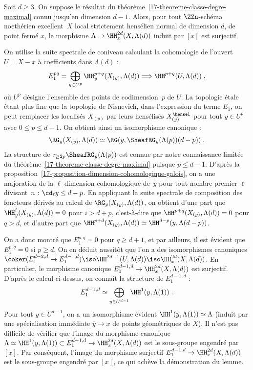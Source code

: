 \documentclass[10pt]{../fichiers-configuration-latex/smfart}
\begin{document}
\begin{lemme2}
Soit $d\geq 3$.
On suppose le résultat du théorème~\ref{17-theoreme-classe-degre-maximal}
connu jusqu'en dimension $d-1$. Alors, pour tout $\ZZn$-schéma noethérien
excellent $X$ local strictement hensélien normal de dimension $d$, de point
fermé $x$, le morphisme $\Lambda\to \HH^{2d}_x(X,\Lambda(d))$
induit par $[x]$ est surjectif.
\end{lemme2}

On utilise la suite spectrale de coniveau calculant la cohomologie de
l'ouvert $U=X-x$ à coefficients dans $\Lambda(d)$ :
\[E_1^{pq}=\bigoplus_{y\in U^p} \HH^{p+q}_y(X_{(y)},\Lambda(d))\Longrightarrow
\HH^{p+q}(U,\Lambda(d))\;\text{,}\]
où $U^p$ désigne l'ensemble des points de codimension $p$ de $U$. La
topologie étale étant plus fine que la topologie de Nisnevich, dans
l'expression du terme $E_1$, on peut remplacer les localisés $X_{(y)}$ par
leurs hensélisés $X_{(y)}^\hensel$ pour tout $y\in U^p$ avec $0\leq p\leq
d-1$. On obtient ainsi un isomorphisme
canonique :
\[\RG_y(X_{(y)},\Lambda(d))\simeq
\RG(y,\SheafRG_y(\Lambda(p))(d-p))\;\text{.}\]
La structure de $\tau_{\geq 2p}\SheafRG_y(\Lambda(p))$ est
connue par notre connaissance limitée du
théorème~\ref{17-theoreme-classe-degre-maximal} puisque $p\leq d-1$. D'après
la proposition~\ref{17-proposition-dimension-cohomologique-galois}, on a une
majoration de la $\ell$-dimension cohomologique de $y$ pour tout nombre
premier $\ell$ divisant $n$ : $\cd_\ell y\leq d-p$.
En appliquant la suite spectrale de composition des
foncteurs dérivés au calcul de $\RG_y(X_{(y)},\Lambda(d))$, on
obtient
d'une part que $\HH^i_y(X_{(y)},\Lambda(d))=0$ pour $i>d+p$, c'est-à-dire que
$\HH^{p+q}(X_{(y)},\Lambda(d))=0$ pour $q>d$, et d'autre part que 
$\HH^{p+d}(X_{(y)},\Lambda(d))\simeq \HH^{d-p}(y,\Lambda(d-p))$.

On a donc montré que $E^{p,q}_1=0$ pour $q\geq d+1$, et par ailleurs, il est
évident que $E^{p,q}_1=0$ si $p\geq d$.
On en déduit aussitôt que l'on a
des isomorphismes canoniques $\coker(E^{d-2,d}_1\to E^{d-1,d}_1)\iso
\HH^{2d-1}(U,\Lambda(d))\iso \HH^{2d}_x(X,\Lambda(d))$. En particulier, le
morphisme canonique $E^{d-1,d}_1\to \HH^{2d}_x(X,\Lambda(d))$ est surjectif.
D'après le calcul ci-dessus, on connaît la structure de $E^{d-1,d}_1$ :
\[E^{d-1,d}_1 \simeq  \bigoplus_{y\in U^{d-1}} \HH^1(y,\Lambda(1))\;\text{.}\]
Pour tout $y\in U^{d-1}$, on a 
un isomorphisme évident $\HH^1(y,\Lambda(1))\simeq \Lambda$ (induit par une
spécialisation immédiate $\overline y\to x$ de points géométriques de $X$).
Il n'est pas difficile de vérifier que l'image du
morphisme canonique $\Lambda\simeq \HH^1(y,\Lambda(1))\subset
E_1^{d-1,d}\to \HH^{2d}_x(X,\Lambda(d))$ est 
le sous-groupe engendré par $[x]$. Par conséquent, l'image du morphisme
surjectif $E^{d-1,d}_1\to \HH^{2d}_x(X,\Lambda(d))$ est le sous-groupe
engendré par $[x]$, ce qui achève la démonstration du lemme.
\end{document}
